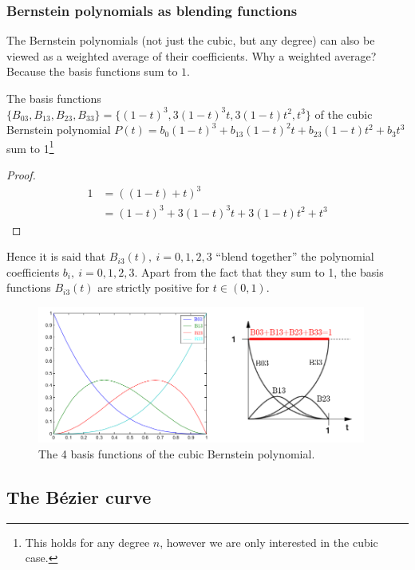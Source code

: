 \documentclass[a4paper]{article}
\begin{document}
\subsubsection{Bernstein polynomials as blending functions}
The Bernstein polynomials (not just the cubic, but any degree) can also be viewed as a weighted average of their coefficients. Why a weighted average? Because the basis functions  sum to $1$.
\begin{corollary}
    The basis functions $\{B_{03}, B_{13}, B_{23}, B_{33}\} = \{(1-t)^3, 3(1-t)^3t, 3(1-t)t^2, t^3\}$ of the cubic Bernstein polynomial $P(t)=b_0(1-t)^3 + b_13(1-t)^2t + b_23(1-t)t^2 + b_3t^3$ sum to 1\footnote{This holds for any degree $n$, however we are only interested in the cubic case.}     
\end{corollary}
\begin{proof}
    \begin{align*}
        1 &= ((1-t)+t)^3 \\
         &= (1-t)^3 + 3(1-t)^3t + 3(1-t)t^2 + t^3
    \end{align*} 
\end{proof}
Hence it is said that $B_{i3}(t), \ i=0,1,2,3$ ``blend together'' the polynomial coefficients $b_i, \ i = 0,1,2,3$. Apart from the fact that they sum to 1, the basis functions $B_{i3}(t)$ are strictly positive for $t\in(0,1)$.
\begin{figure}[H]
    \centering
    \includegraphics[height=4.5cm]{img/bezier/bernstein_coeff_cubic.png}
    \caption{The 4 basis functions of the cubic Bernstein polynomial.}%
\end{figure}





\subsection{The B\'ezier curve}
\end{document}
